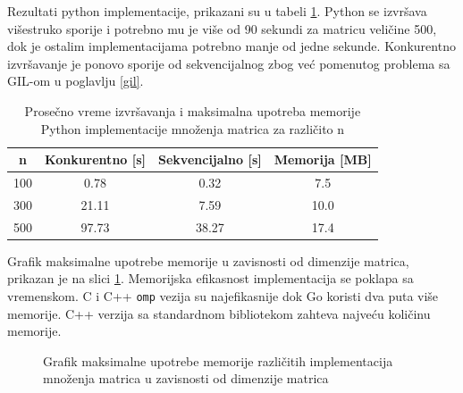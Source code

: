 \documentclass[12pt,oneside]{memoir}
\begin{document}
Rezultati python implementacije, prikazani su u tabeli \ref{tab:matrix1}. Python se izvršava višestruko sporije i potrebno mu je više od 90 sekundi za matricu veličine 500, dok je ostalim implementacijama potrebno manje od jedne sekunde. Konkurentno izvršavanje je ponovo sporije od sekvencijalnog zbog već pomenutog problema sa GIL-om u poglavlju \ref{gil}.
\\

\begin{table}
\begin{center}
\caption{Prosečno vreme izvršavanja i maksimalna upotreba memorije Python implementacije množenja matrica za različito n}
\begin{tabular}{||c||c|c|c||}
\hline
n & Konkurentno [s]& Sekvencijalno [s] & Memorija [MB] \\ \hline
100	&0.78	&0.32&7.5\\
300	&21.11&7.59&10.0\\
500	&97.73&38.27&17.4\\
\hline
\end{tabular}
\label{tab:matrix1}
\end{center}
\end{table}

Grafik maksimalne upotrebe memorije u zavisnosti od dimenzije matrica, prikazan je na slici \ref{fig:matrix2}. Memorijska efikasnost implementacija se poklapa sa vremenskom. C i C++ \texttt{omp} vezija su najefikasnije dok Go koristi dva puta više memorije. C++ verzija sa standardnom bibliotekom zahteva najveću količinu memorije. 
\\

\begin{figure}
\begin{center}


\caption{Grafik maksimalne upotrebe memorije različitih implementacija množenja matrica u zavisnosti od dimenzije matrica}
\label{fig:matrix2}
\end{center}
\end{figure}
\end{document}
